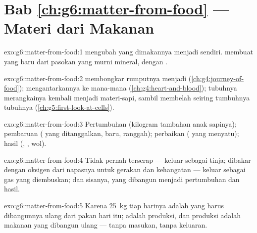 \section*{Bab \ref{ch:g6:matter-from-food} --- Materi dari Makanan}

\begin{solution}{exo:g6:matter-from-food:1}
 mengubah  yang dimakannya menjadi  sendiri.  membuat  yang baru dari
pasokan yang murni mineral, dengan  .
\end{solution}

\begin{solution}{exo:g6:matter-from-food:2}
 membongkar rumputnya menjadi 
(\cref{ch:g4:journey-of-food});  mengantarkannya ke mana-mana
(\cref{ch:g4:heart-and-blood});  tubuhnya merangkainya kembali
menjadi materi-sapi, sambil membelah seiring tumbuhnya tubuhnya
(\cref{ch:g5:first-look-at-cells}).
\end{solution}

\begin{solution}{exo:g6:matter-from-food:3}
Pertumbuhan (kilogram tambahan anak sapinya); pembaruan ( yang
ditanggalkan,  baru, ranggah); perbaikan ( yang
menyatu); hasil (, , wol).
\end{solution}

\begin{solution}{exo:g6:matter-from-food:4}
Tidak pernah terserap --- keluar sebagai tinja; dibakar dengan oksigen
dari napasnya untuk gerakan dan kehangatan --- keluar sebagai gas yang
diembuskan; dan sisanya, yang dibangun menjadi pertumbuhan dan hasil.
\end{solution}

\begin{solution}{exo:g6:matter-from-food:5}
Karena \qty{25}{kg}  tiap harinya adalah  yang harus
dibangunnya ulang dari pakan hari itu;  adalah produksi, dan
produksi adalah makanan yang dibangun ulang --- tanpa masukan, tanpa
keluaran.
\end{solution}

